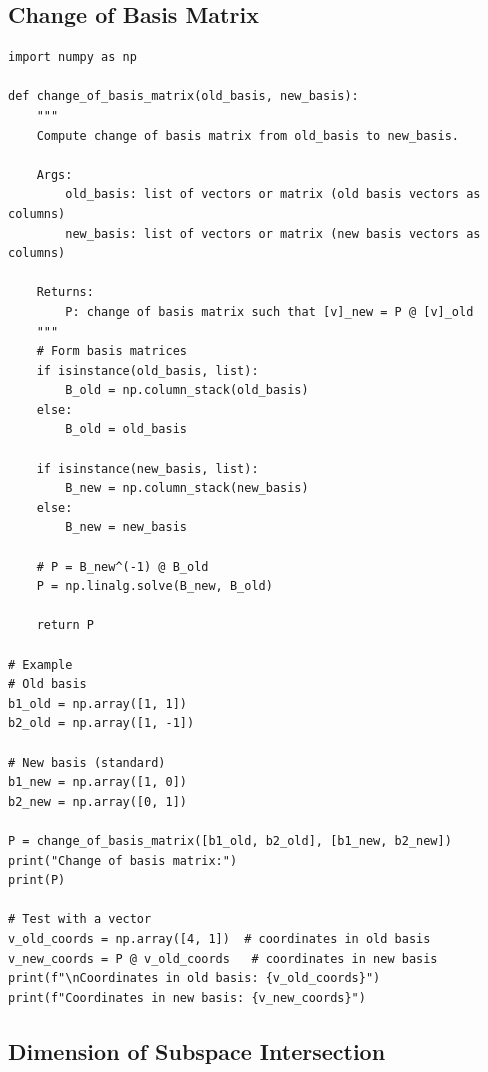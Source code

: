 \documentclass[12pt,a4paper]{article}
\theoremstyle{definition}
\begin{document}
\subsection{Change of Basis Matrix}

\begin{verbatim}
import numpy as np

def change_of_basis_matrix(old_basis, new_basis):
    """
    Compute change of basis matrix from old_basis to new_basis.
    
    Args:
        old_basis: list of vectors or matrix (old basis vectors as columns)
        new_basis: list of vectors or matrix (new basis vectors as columns)
    
    Returns:
        P: change of basis matrix such that [v]_new = P @ [v]_old
    """
    # Form basis matrices
    if isinstance(old_basis, list):
        B_old = np.column_stack(old_basis)
    else:
        B_old = old_basis
        
    if isinstance(new_basis, list):
        B_new = np.column_stack(new_basis)
    else:
        B_new = new_basis
    
    # P = B_new^(-1) @ B_old
    P = np.linalg.solve(B_new, B_old)
    
    return P

# Example
# Old basis
b1_old = np.array([1, 1])
b2_old = np.array([1, -1])

# New basis (standard)
b1_new = np.array([1, 0])
b2_new = np.array([0, 1])

P = change_of_basis_matrix([b1_old, b2_old], [b1_new, b2_new])
print("Change of basis matrix:")
print(P)

# Test with a vector
v_old_coords = np.array([4, 1])  # coordinates in old basis
v_new_coords = P @ v_old_coords   # coordinates in new basis
print(f"\nCoordinates in old basis: {v_old_coords}")
print(f"Coordinates in new basis: {v_new_coords}")
\end{verbatim}

\subsection{Dimension of Subspace Intersection}
\end{document}
